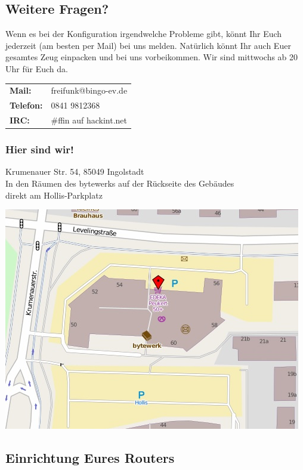 \documentclass[10pt]{extarticle}
\newenvironment{Figure}
  {\par\medskip\noindent\minipage{\linewidth}}
  {\endminipage\par\medskip}
\begin{document}
\begin{multicols}{2}

\subsection*{Weitere Fragen?}
Wenn es bei der Konfiguration irgendwelche Probleme gibt, könnt Ihr Euch jederzeit (am besten per Mail) bei uns melden. Natürlich könnt Ihr auch Euer gesamtes Zeug einpacken und bei uns vorbeikommen. Wir sind mittwochs ab 20 Uhr für Euch da. \\

\begin{tabular}{ll}
\textbf{Mail:} 			& freifunk@bingo-ev.de\\
\textbf{Telefon:}  	& 0841 9812368\\
\textbf{IRC:} 			& \#ffin auf hackint.net
\end{tabular}

\subsubsection*{Hier sind wir!}
Krumenauer Str. 54, 85049 Ingolstadt\\
In den Räumen des bytewerks auf der Rückseite des Gebäudes\\
direkt am Hollis-Parkplatz\\


\begin{Figure}
\centering
\includegraphics[width=0.8 \textwidth]{hiersindwir.png}
\end{Figure}

\columnbreak
\subsection*{Einrichtung Eures Routers}


\end{multicols}
\end{document}
